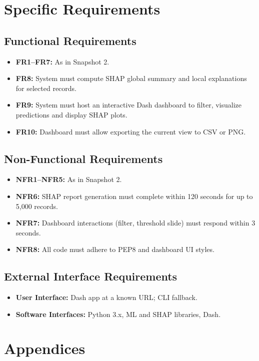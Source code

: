 \documentclass[15pt]{article}
\begin{document}
\section{Specific Requirements}
\subsection{Functional Requirements}
\begin{itemize}
  \item \textbf{FR1–FR7:} As in Snapshot 2.
  \item \textbf{FR8:} System must compute SHAP global summary and local explanations for selected records.
  \item \textbf{FR9:} System must host an interactive Dash dashboard to filter, visualize predictions and display SHAP plots.
  \item \textbf{FR10:} Dashboard must allow exporting the current view to CSV or PNG.
\end{itemize}

\subsection{Non-Functional Requirements}
\begin{itemize}
  \item \textbf{NFR1–NFR5:} As in Snapshot 2.
  \item \textbf{NFR6:} SHAP report generation must complete within 120 seconds for up to 5,000 records.
  \item \textbf{NFR7:} Dashboard interactions (filter, threshold slide) must respond within 3 seconds.
  \item \textbf{NFR8:} All code must adhere to PEP8 and dashboard UI styles.
\end{itemize}

\subsection{External Interface Requirements}
\begin{itemize}
  \item \textbf{User Interface:} Dash app at a known URL; CLI fallback.
  \item \textbf{Software Interfaces:} Python 3.x, ML and SHAP libraries, Dash.
\end{itemize}

\section{Appendices}
\end{document}
